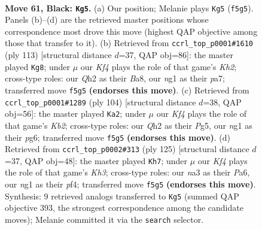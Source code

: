 \documentclass[11pt]{article}
\begin{document}
\clearpage

\begin{figure}[p]\centering
\begin{subfigure}{0.46\textwidth}\centering
\resizebox{\linewidth}{!}{%
\newchessgame
\chessboard[
  setfen={8/4P3/p3Q3/3P1k1p/6p1/Nb6/5P1q/5KN1 b - - 2 61},
  showmover=false,
  pgfstyle=straightmove, color=movearrow, markmove={f5-g5}
]}
\caption{}
\end{subfigure}\hfill
\begin{subfigure}{0.46\textwidth}\centering
\resizebox{\linewidth}{!}{%
\newchessgame
\chessboard[
  setfen={b7/P5pk/5pQ1/4p2P/8/8/5qPK/8 b - - 1 57},
  showmover=false,
  pgfstyle=straightmove, color=movearrow, markmove={h7-g8}
]}
\caption{}
\end{subfigure}
\\[4pt]
\begin{subfigure}{0.46\textwidth}\centering
\resizebox{\linewidth}{!}{%
\newchessgame
\chessboard[
  setfen={8/2Q2p1k/6p1/p5P1/1q5P/8/1KP2P2/8 w - - 9 53},
  showmover=false,
  pgfstyle=straightmove, color=movearrow, markmove={b2-a2}
]}
\caption{}
\end{subfigure}\hfill
\begin{subfigure}{0.46\textwidth}\centering
\resizebox{\linewidth}{!}{%
\newchessgame
\chessboard[
  setfen={5Q2/8/p5pk/1p2P3/1P3P1b/P7/3q1NK1/8 b - - 1 63},
  showmover=false,
  pgfstyle=straightmove, color=movearrow, markmove={h6-h7}
]}
\caption{}
\end{subfigure}
\caption{\textbf{Move 61, Black: \texttt{Kg5}.} (a) Our position; Melanie plays \texttt{Kg5} (\texttt{f5g5}). Panels (b)--(d) are the retrieved master positions whose correspondence most drove this move (highest QAP objective among those that transfer to it). (b) Retrieved from \texttt{ccrl\_top\_p0001\#1610} (ply 113) [structural distance $d$=37, QAP obj=86]: the master played \texttt{Kg8}; under $\mu$ our \emph{Kf4} plays the role of that game's \emph{Kh2}; cross-type roles: our \emph{Q}h2 as their \emph{B}a8, our \emph{n}g1 as their \emph{p}a7; transferred move \texttt{f5g5} \textbf{(endorses this move)}. (c) Retrieved from \texttt{ccrl\_top\_p0001\#1289} (ply 104) [structural distance $d$=38, QAP obj=56]: the master played \texttt{Ka2}; under $\mu$ our \emph{Kf4} plays the role of that game's \emph{Kb2}; cross-type roles: our \emph{Q}h2 as their \emph{P}g5, our \emph{n}g1 as their \emph{p}g6; transferred move \texttt{f5g5} \textbf{(endorses this move)}. (d) Retrieved from \texttt{ccrl\_top\_p0002\#313} (ply 125) [structural distance $d$=37, QAP obj=48]: the master played \texttt{Kh7}; under $\mu$ our \emph{Kf4} plays the role of that game's \emph{Kh3}; cross-type roles: our \emph{n}a3 as their \emph{P}a6, our \emph{n}g1 as their \emph{p}f4; transferred move \texttt{f5g5} \textbf{(endorses this move)}. Synthesis: 9 retrieved analogs transferred to \texttt{Kg5} (summed QAP objective 393, the strongest correspondence among the candidate moves); Melanie committed it via the \texttt{search} selector.}
\label{fig:thought-m121}
\end{figure}
\end{document}
